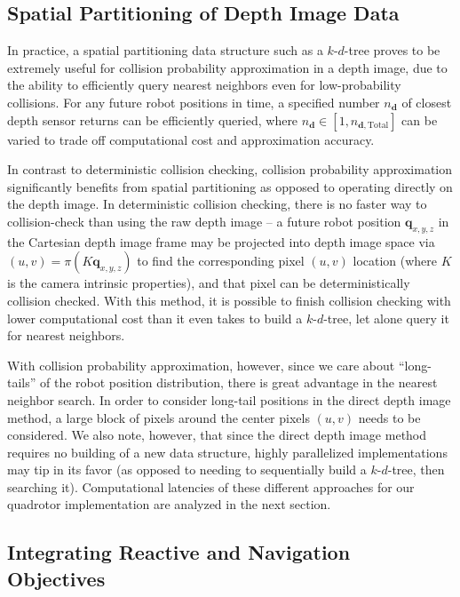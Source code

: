 \documentclass{llncs}
\begin{document}
\subsection{Spatial Partitioning of Depth Image Data}

In practice, a spatial partitioning data structure such as a $k$-$d$-tree proves to be extremely useful for collision probability approximation in a depth image, due to the ability to efficiently query nearest neighbors even for low-probability collisions.  For any future robot positions in time, a specified number $n_{\mathbf{d}} $ of closest depth sensor returns can be efficiently queried, where $n_{\mathbf{d}} \in [1, n_{\mathbf{d}, \text{Total}}]$ can be varied to trade off computational cost and approximation accuracy.

In contrast to deterministic collision checking, collision probability approximation significantly benefits from spatial partitioning as opposed to operating directly on the depth image.  In deterministic collision checking, there is no faster way to collision-check than using the raw depth image -- a future robot position $\mathbf{q}_{x,y,z}$ in the Cartesian depth image frame may be projected into depth image space via $(u,v) = \pi (K \mathbf{q}_{x,y,z})$ to find the corresponding pixel $(u,v)$ location (where $K$ is the camera intrinsic properties), and that pixel can be deterministically collision checked.  With this method, it is possible to finish collision checking with lower computational cost than it even takes to build a $k$-$d$-tree, let alone query it for nearest neighbors.

With collision probability approximation, however, since we care about ``long-tails'' of the robot position distribution, there is great advantage in the nearest neighbor search.  In order to consider long-tail positions in the direct depth image method, a large block of pixels around the center pixels $(u,v)$ needs to be considered.  We also note, however, that since the direct depth image method requires no building of a new data structure, highly parallelized implementations may tip in its favor (as opposed to needing to sequentially build a $k$-$d$-tree, then searching it).  Computational latencies of these different approaches for our quadrotor implementation are analyzed in the next section.

\subsection{Integrating Reactive and Navigation Objectives}
\end{document}
